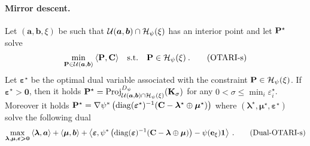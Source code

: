 \paragraph{Mirror descent.}



\begin{proposition}\label{prop:pcot}
  Let $(\bm{a}, \bm{b}, \xi)$ be such that ${\mathcal{U}}(\bm{a}, \bm{b}) \cap \mathcal{H}_\psi(\xi)$ has an interior point and let ${\mathbf{P}}^\star$ solve
  \begin{align}\label{eq:pcOT}
    \min_{{\mathbf{P}} \in {\mathcal{U}}(\bm{a}, \bm{b})} \: \langle {\mathbf{P}}, \mathbf{C} \rangle \quad \text{s.t.} \quad  {\mathbf{P}} \in \mathcal{H}_\psi(\xi) \:.
    \tag{OTARI-s}
\end{align}
Let $\bm{\varepsilon}^\star$ be the optimal dual variable associated with the constraint ${\mathbf{P}} \in \mathcal{H}_\psi(\xi)$.
If $\bm{\varepsilon}^\star \bm{>} \bm{0}$, then it holds ${\mathbf{P}}^\star = \operatorname{Proj}^{D_\psi}_{{\mathcal{U}}(\bm{a}, \bm{b}) \cap \mathcal{H}_\psi(\xi)}({\mathbf{K}}_\sigma)$ for any $0 < \sigma \leq \min_i{\varepsilon_i^\star}$. Moreover it holds ${\mathbf{P}}^\star = \nabla \psi^* \left(\operatorname{diag}(\bm{\varepsilon}^\star)^{-1} ({\mathbf{C}} - \bm{\lambda}^\star \oplus \bm{\mu}^\star) \right)$ where $(\bm{\lambda}^\star, \bm{\mu}^\star, \bm{\varepsilon}^\star)$ solve the following dual
\begin{align}
  \max_{\bm{\lambda}, \bm{\mu}, \bm{\varepsilon} \bm{>} \bm{0}} \: \langle \bm{\lambda}, \bm{a} \rangle + \langle \bm{\mu}, \bm{b} \rangle + \left\langle \bm{\varepsilon}, \psi^*\left(\operatorname{diag}(\bm{\varepsilon})^{-1} ({\mathbf{C}} - \bm{\lambda} \oplus \bm{\mu}) \right) - \psi(\mathbf{e}_\xi) \bm{1}  \right\rangle \:.
  \tag{Dual-OTARI-s}
\end{align}
\end{proposition}

